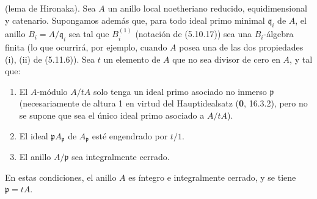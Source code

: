 \begin{proposition}[5.12.8]
\label{IV.2.s5.12.8-fr}
(lema de Hironaka). Sea $A$ un anillo local noetheriano reducido,
equidimensional y catenario. Supongamos además que, para todo ideal primo
minimal $\mathfrak q_i$ de $A$, el anillo $B_i=A/\mathfrak q_i$ sea tal que
$B_i^{(1)}$ \textup{(notación de (5.10.17))} sea una $B_i$-álgebra finita \textup{(lo que
ocurrirá, por ejemplo, cuando $A$ posea una de las dos propiedades (i), (ii) de
(5.11.6))}. Sea $t$ un elemento de $A$ que no sea divisor de cero en $A$, y tal
que:
\begin{enumerate}
\item[\textup{(i)}] El $A$-módulo $A/tA$ solo tenga un ideal primo asociado no inmerso
$\mathfrak p$ \textup{(necesariamente de altura 1 en virtud del Hauptidealsatz (\textbf{0},
16.3.2), pero no se supone que sea el único ideal primo asociado a $A/tA$)}.
\item[\textup{(ii)}] El ideal $\mathfrak pA_{\mathfrak p}$ de $A_{\mathfrak p}$ esté
engendrado por $t/1$.
\item[\textup{(iii)}] El anillo $A/\mathfrak p$ sea integralmente cerrado.
\end{enumerate}
En estas condiciones, el anillo $A$ es íntegro e integralmente cerrado, y se
tiene $\mathfrak p=tA$.
\end{proposition}


